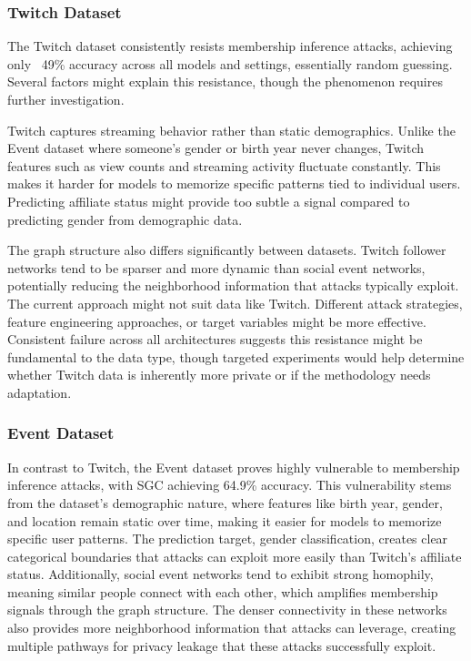 \documentclass{article}
\begin{document}
\subsubsection{Twitch Dataset}
The Twitch dataset consistently resists membership inference attacks, achieving only ~49\% accuracy across all models and settings, essentially random guessing. Several factors might explain this resistance, though the phenomenon requires further investigation.

Twitch captures streaming behavior rather than static demographics. Unlike the Event dataset where someone's gender or birth year never changes, Twitch features such as view counts and streaming activity fluctuate constantly. This makes it harder for models to memorize specific patterns tied to individual users. Predicting affiliate status might provide too subtle a signal compared to predicting gender from demographic data.

The graph structure also differs significantly between datasets. Twitch follower networks tend to be sparser and more dynamic than social event networks, potentially reducing the neighborhood information that attacks typically exploit. The current approach might not suit data like Twitch. Different attack strategies, feature engineering approaches, or target variables might be more effective. Consistent failure across all architectures suggests this resistance might be fundamental to the data type, though targeted experiments would help determine whether Twitch data is inherently more private or if the methodology needs adaptation.

\subsubsection{Event Dataset}
In contrast to Twitch, the Event dataset proves highly vulnerable to membership inference attacks, with SGC achieving 64.9\% accuracy. This vulnerability stems from the dataset's demographic nature, where features like birth year, gender, and location remain static over time, making it easier for models to memorize specific user patterns. The prediction target, gender classification, creates clear categorical boundaries that attacks can exploit more easily than Twitch's affiliate status. Additionally, social event networks tend to exhibit strong homophily, meaning similar people connect with each other, which amplifies membership signals through the graph structure. The denser connectivity in these networks also provides more neighborhood information that attacks can leverage, creating multiple pathways for privacy leakage that these attacks successfully exploit.
\end{document}
